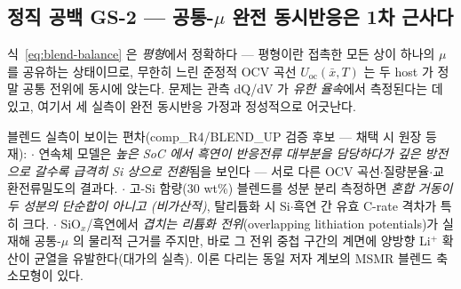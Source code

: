 \subsection{정직 공백 GS-2 --- 공통-$\mu$ 완전 동시반응은 1차 근사다}\label{ssec:si-blend-gs2}
식~\eqref{eq:blend-balance} 은 \emph{평형}에서 정확하다 --- 평형이란 접촉한 모든 상이 하나의 $\mu$ 를
공유하는 상태이므로, 무한히 느린 준정적 OCV 곡선 $U_\mathrm{oc}(\bar x,T)$ 는 두 host 가 정말 공통 전위에
동시에 앉는다. 문제는 관측 dQ/dV 가 \emph{유한 율속}에서 측정된다는 데 있고, 여기서 세 실측이 완전
동시반응 가정과 정성적으로 어긋난다.

\begin{srcbox}
블렌드 실측이 보이는 편차(comp\_R4/BLEND\_UP 검증 후보 --- 채택 시 원장 등재):
$\cdot$ 연속체 모델은 \emph{높은 SoC 에서 흑연이 반응전류 대부분을 담당하다가 깊은 방전으로 갈수록
급격히 Si 상으로 전환}됨을 보인다 --- 서로 다른 OCV 곡선$\cdot$질량분율$\cdot$교환전류밀도의
결과다\cite{ai_blend2022}.
$\cdot$ 고-Si 함량(30 wt\%) 블렌드를 성분 분리 측정하면 \emph{혼합 거동이 두 성분의 단순합이 아니고
(비가산적)}, 탈리튬화 시 Si$\cdot$흑연 간 유효 C-rate 격차가 특히 크다\cite{chatzogiannakis_blend2025}.
$\cdot$ SiO$_x$/흑연에서 \emph{겹치는 리튬화 전위}(overlapping lithiation potentials)가 실재해 공통-$\mu$
의 물리적 근거를 주지만, 바로 그 전위 중첩 구간의 계면에 양방향 Li$^+$ 확산이 균열을 유발한다(대가의
실측)\cite{zhan_blend2026}. 이론 다리는 동일 저자 계보의 MSMR 블렌드 축소모형이
있다\cite{tu_blend2024}.
\end{srcbox}

